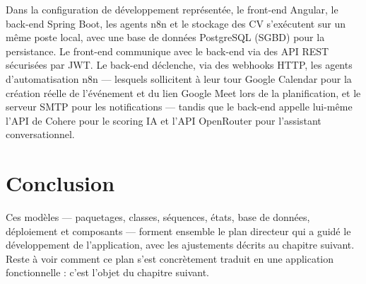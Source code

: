 Dans la configuration de développement représentée, le front-end Angular, le back-end Spring Boot, les agents n8n et le stockage des CV s’exécutent sur un même poste local, avec une base de données PostgreSQL (SGBD) pour la persistance. Le front-end communique avec le back-end via des API REST sécurisées par JWT. Le back-end déclenche, via des webhooks HTTP, les agents d’automatisation n8n — lesquels sollicitent à leur tour Google Calendar pour la création réelle de l’événement et du lien Google Meet lors de la planification, et le serveur SMTP pour les notifications — tandis que le back-end appelle lui-même l’API de Cohere pour le scoring IA et l’API OpenRouter pour l’assistant conversationnel.

\section{Conclusion}
\label{sec_3_10}
Ces modèles — paquetages, classes, séquences, états, base de données, déploiement et composants — forment ensemble le plan directeur qui a guidé le développement de l’application, avec les ajustements décrits au chapitre suivant. Reste à voir comment ce plan s’est concrètement traduit en une application fonctionnelle : c’est l’objet du chapitre suivant.
